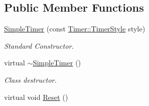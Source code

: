 \subsection*{Public Member Functions}
\begin{DoxyCompactItemize}
\item 
\hyperlink{classphys_1_1SimpleTimer_a3094be3aaf4cf65189604a413fa56f95}{SimpleTimer} (const \hyperlink{classphys_1_1Timer_a1ee86bf43e20329d750c5d582dcce329}{Timer::TimerStyle} style)
\begin{DoxyCompactList}\small\item\em Standard Constructor. \item\end{DoxyCompactList}\item 
\hypertarget{classphys_1_1SimpleTimer_ae7ef0b3d2b00b97d9c8a69654d9f6d74}{
virtual \hyperlink{classphys_1_1SimpleTimer_ae7ef0b3d2b00b97d9c8a69654d9f6d74}{$\sim$SimpleTimer} ()}
\label{d0/d15/classphys_1_1SimpleTimer_ae7ef0b3d2b00b97d9c8a69654d9f6d74}

\begin{DoxyCompactList}\small\item\em Class destructor. \item\end{DoxyCompactList}\item 
\hypertarget{classphys_1_1SimpleTimer_adea8d8b608e5abb96460c83f7b47f94f}{
virtual void \hyperlink{classphys_1_1SimpleTimer_adea8d8b608e5abb96460c83f7b47f94f}{Reset} ()}
\label{d0/d15/classphys_1_1SimpleTimer_adea8d8b608e5abb96460c83f7b47f94f}


\end{DoxyCompactItemize}
